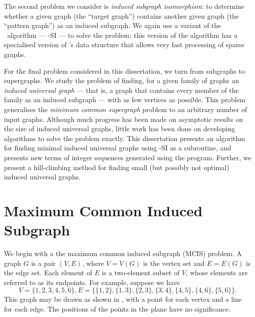 The second problem we consider is \emph{induced subgraph isomorphism}: to determine
whether a given graph (the ``target graph'') contains another given graph (the ``pattern graph'')
as an induced subgraph.  We again use a variant of the \McSplit\ algorithm ---
\McSplit-SI --- to solve the problem; this version of the algorithm has a specialised
version of \McSplit's data structure that allows very fast processing of sparse graphs.

For the final problem considered in this dissertation, we turn from subgraphs
to supergraphs.  We study the problem of finding, for a given family of graphs
an \textit{induced universal graph} --- that is, a graph that contains every
member of the family as an induced subgraph --- with as few vertices as
possible.  This problem generalises the \textit{minimum common supergraph}
problem to an arbitrary number of input graphs.  Although much progress has
been made on asymptotic results on the size of induced universal graphs, little
work has been done on developing algorithms to solve the problem exactly.  This
dissertation presents an algorithm for finding minimal induced universal graphs
using \McSplit-SI as a subroutine, and presents new terms of integer sequences
generated using the program.  Further, we present a hill-climbing method for
finding small (but possibly not optimal) induced universal graphs.



\section{Maximum Common Induced Subgraph}

We begin with a the maximum common induced subgraph (MCIS) problem. A
graph $G$ is a pair $(V, E)$, where $V = V(G)$ is the vertex set and $E = E(G)$
is the edge set. Each element of $E$ is a two-element subset of $V$, whose
elements are referred to as its endpoints. For example, suppose we have
\[
V = \{1, 2, 3, 4, 5, 6\},
E = \{\{1,2\}, \{1,3\}, \{2,3\}, \{3,4\}, \{4,5\}, \{4,6\}, \{5,6\}\}
.
\]
This graph may be drawn as shown in , with a point for each
vertex and a line for each edge.  The positions of the points in the plane have
no significance.

